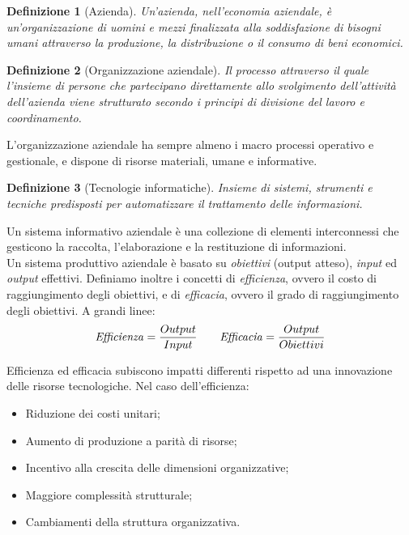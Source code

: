 \documentclass[a4paper, 11pt]{article}
\newtheorem{definit}{Definizione}[subsection]
\begin{document}
	\begin{definit}[Azienda]
		Un'azienda, nell'economia aziendale, è un'organizzazione di uomini e mezzi finalizzata alla soddisfazione di bisogni umani attraverso la produzione, la distribuzione o il consumo di beni economici.
	\end{definit}
	
	\begin{definit}[Organizzazione aziendale]
		Il processo attraverso il quale l'insieme di persone che partecipano direttamente allo svolgimento dell'attività dell'azienda viene strutturato secondo i principi di divisione del lavoro e coordinamento.
	\end{definit}
	L'organizzazione aziendale ha sempre almeno i macro processi operativo e gestionale, e dispone di risorse materiali, umane e informative.
	
	\begin{definit}[Tecnologie informatiche]
		Insieme di sistemi, strumenti e tecniche predisposti per automatizzare il trattamento delle informazioni.
	\end{definit}
	
	Un sistema informativo aziendale è una collezione di elementi interconnessi che gesticono la raccolta, l'elaborazione e la restituzione di informazioni. \\
	
	Un sistema produttivo aziendale è basato su \textit{obiettivi} (output atteso), \textit{input} ed \textit{output} effettivi. Definiamo inoltre i concetti di \textit{efficienza}, ovvero il costo di raggiungimento degli obiettivi, e di \textit{efficacia}, ovvero il grado di raggiungimento degli obiettivi. A grandi linee: \[ \text{\textit{Efficienza}} = \frac{Output}{Input} \qquad \text{\textit{Efficacia}} = \frac{Output}{Obiettivi}  \]
	
	Efficienza ed efficacia subiscono impatti differenti rispetto ad una innovazione delle risorse tecnologiche. Nel caso dell'efficienza: \begin{itemize}
		\item Riduzione dei costi unitari;
		\item Aumento di produzione a parità di risorse;
		\item Incentivo alla crescita delle dimensioni organizzative;
		\item Maggiore complessità strutturale;
		\item Cambiamenti della struttura organizzativa.
	\end{itemize}
	
\end{document}
